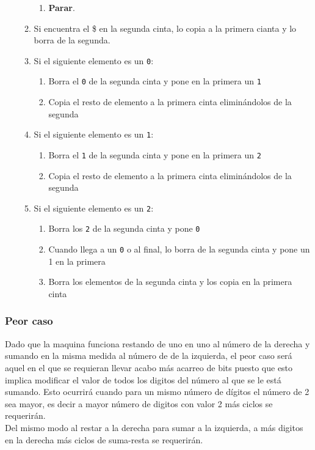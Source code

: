 \begin{itemize}
\begin{enumerate}
\begin{enumerate}[1.]
            \item \textbf{Parar}.
        \end{enumerate}
        \item Si encuentra el \$ en la segunda cinta, lo copia a la primera cianta y lo borra de la segunda.
        \item Si el siguiente elemento es un \texttt{0}:
        \begin{enumerate}[1.]
            \item Borra el \texttt{0} de la segunda cinta y pone en la primera un \texttt{1}
            \item Copia el resto de elemento a la primera cinta eliminándolos de la segunda
        \end{enumerate}
        \item Si el siguiente elemento es un \texttt{1}:
        \begin{enumerate}[1.]
            \item Borra el \texttt{1} de la segunda cinta y pone en la primera un \texttt{2}
            \item Copia el resto de elemento a la primera cinta eliminándolos de la segunda
        \end{enumerate}
        \item Si el siguiente elemento es un \texttt{2}:
        \begin{enumerate}[1.]
            \item Borra los \texttt{2} de la segunda cinta y pone \texttt{0}
            \item Cuando llega a un \texttt{0} o al final, lo borra de la segunda cinta y pone un 1 en la primera
            \item Borra los elementos de la segunda cinta y los copia en la primera cinta
        \end{enumerate}
    \end{enumerate}
\end{itemize}




\subsubsection*{Peor caso}
Dado que la maquina funciona restando de uno en uno al número de la derecha y sumando en la misma medida al número de de la izquierda, el peor caso será aquel en el que se requieran llevar acabo más acarreo de bits puesto que esto implica modificar el valor de todos los digitos del número al que se le está sumando. Esto ocurrirá cuando para un mismo número de dígitos el número de 2 sea mayor, es decir a mayor número de digitos con valor 2 más ciclos se requerirán.\\
Del mismo modo al restar a la derecha para sumar a la izquierda, a más digitos en la derecha más ciclos de suma-resta se requerirán.

